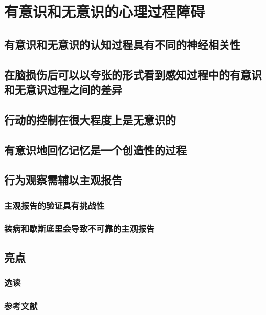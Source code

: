 \chapter{有意识和无意识的心理过程障碍}


\section{有意识和无意识的认知过程具有不同的神经相关性}

\section{在脑损伤后可以以夸张的形式看到感知过程中的有意识和无意识过程之间的差异}

\section{行动的控制在很大程度上是无意识的}

\section{有意识地回忆记忆是一个创造性的过程}

\section{行为观察需辅以主观报告}
\subsection{主观报告的验证具有挑战性}
\subsection{装病和歇斯底里会导致不可靠的主观报告}

\section{亮点}
\subsection{选读}
\subsection{参考文献}